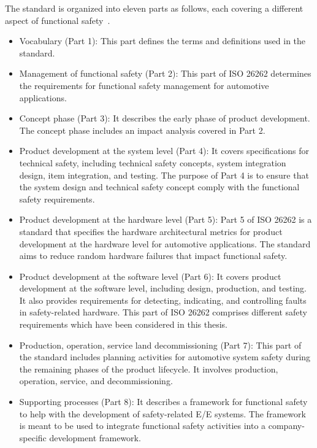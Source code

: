     The standard is organized into eleven parts as follows, each covering a different aspect of functional safety~\cite{iso26262}.
    \begin{itemize}
        \item Vocabulary (Part 1): This part defines the terms and definitions used in the standard.
        \item Management of functional safety (Part 2): This part of ISO 26262 determines the requirements for functional safety management for automotive applications.
        
        \item Concept phase (Part 3): It describes the early phase of product development. The concept phase includes an impact analysis covered in Part 2. 

        \item Product development at the system level (Part 4):  It covers specifications for technical safety, including technical safety concepts, system integration design, item integration, and testing. 
        The purpose of Part 4 is to ensure that the system design and technical safety concept comply with the functional safety requirements.
        
        \item  Product development at the hardware level (Part 5): Part 5 of ISO 26262 is a standard that specifies the hardware architectural metrics for product development at the hardware level for automotive applications. The standard aims to reduce random hardware failures that impact functional safety.
        
        \item  Product development at the software level (Part 6): It covers product development at the software level, including design, production, and testing. It also provides requirements for detecting, indicating, and controlling faults in safety-related hardware. This part of ISO 26262 comprises different safety requirements which have been considered in this thesis.  
        
        \item Production, operation, service land decommissioning (Part 7): This part of the standard includes planning activities for automotive system safety during the remaining phases of the product lifecycle. It involves production, operation, service, and decommissioning.
        
        \item  Supporting processes (Part 8): It describes a framework for functional safety to help with the development of safety-related E/E systems. The framework is meant to be used to integrate functional safety activities into a company-specific development framework.
        

\end{itemize}
